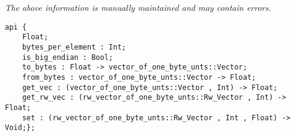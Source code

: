 \label{api:Pack\_Float}

{\tiny \it The above information is manually maintained and may contain errors.}
\begin{verbatim}
api {
    Float;
    bytes_per_element : Int;
    is_big_endian : Bool;
    to_bytes : Float -> vector_of_one_byte_unts::Vector;
    from_bytes : vector_of_one_byte_unts::Vector -> Float;
    get_vec : (vector_of_one_byte_unts::Vector , Int) -> Float;
    get_rw_vec : (rw_vector_of_one_byte_unts::Rw_Vector , Int) -> Float;
    set : (rw_vector_of_one_byte_unts::Rw_Vector , Int , Float) -> Void;};
\end{verbatim}
